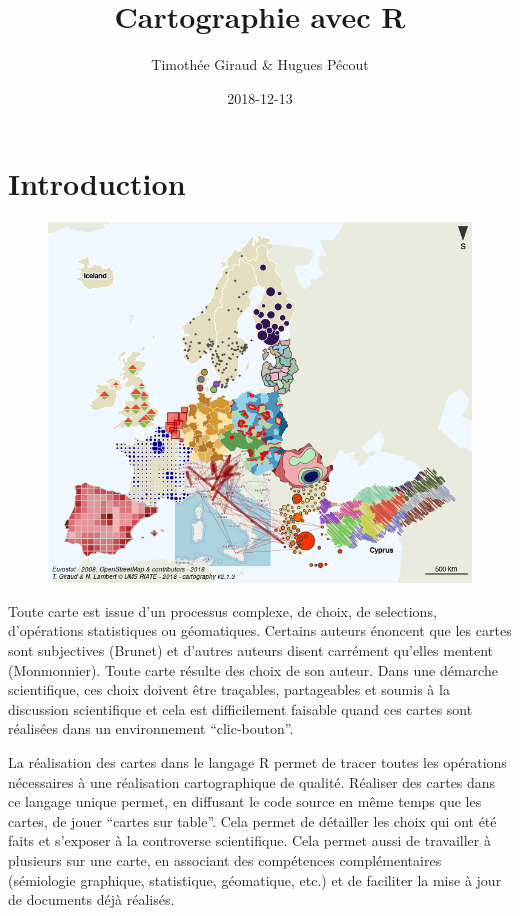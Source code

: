\documentclass[]{book}
\title{Cartographie avec R}
\author{Timothée Giraud \& Hugues Pécout}
\date{2018-12-13}
\begin{document}
\maketitle

{
\setcounter{tocdepth}{1}
\tableofcontents
}
\chapter*{Introduction}\label{introduction}

\begin{figure}
\centering
\includegraphics{img/cartomix.png}
\caption{}
\end{figure}

Toute carte est issue d'un processus complexe, de choix, de selections,
d'opérations statistiques ou géomatiques. Certains auteurs énoncent que
les cartes sont subjectives (Brunet) et d'autres auteurs disent
carrément qu'elles mentent (Monmonnier). Toute carte résulte des choix
de son auteur. Dans une démarche scientifique, ces choix doivent être
traçables, partageables et soumis à la discussion scientifique et cela
est difficilement faisable quand ces cartes sont réalisées dans un
environnement ``clic-bouton''.

La réalisation des cartes dans le langage R permet de tracer toutes les
opérations nécessaires à une réalisation cartographique de qualité.
Réaliser des cartes dans ce langage unique permet, en diffusant le code
source en même temps que les cartes, de jouer ``cartes sur table''. Cela
permet de détailler les choix qui ont été faits et s'exposer à la
controverse scientifique. Cela permet aussi de travailler à plusieurs
sur une carte, en associant des compétences complémentaires (sémiologie
graphique, statistique, géomatique, etc.) et de faciliter la mise à jour
de documents déjà réalisés.
\end{document}
